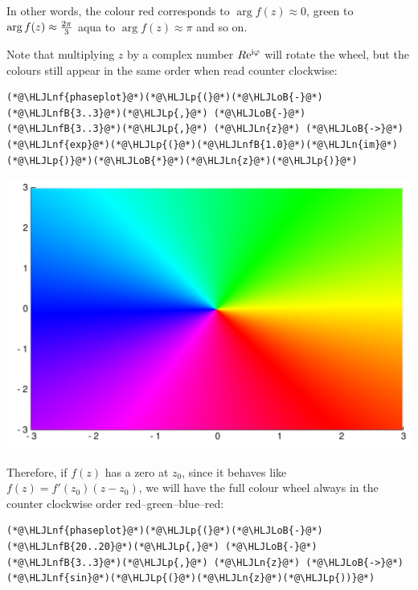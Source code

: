 \documentclass[12pt,a4paper]{article}
\newcommand{\HLJLn}[1]{#1}
\newcommand{\HLJLnf}[1]{\textcolor[RGB]{66,102,213}{#1}}
\newcommand{\HLJLnfB}[1]{\textcolor[RGB]{59,151,46}{#1}}
\newcommand{\HLJLoB}[1]{\textcolor[RGB]{102,102,102}{\textbf{#1}}}
\newcommand{\HLJLp}[1]{#1}
\def\I{ {\rm i} }
\def\E{ {\rm e} }
\def\endash{–}
\begin{document}
In other words, the colour red corresponds to $\arg f(z) \approx 0$, green to $\arg f(z) \approx {2 \pi \over 3}$ aqua to $\arg f(z) \approx \pi$ and so on. 

Note that multiplying $z$ by a complex number $R \E^{\I \varphi}$ will rotate the wheel, but the colours still appear in the same order when read counter clockwise:


\begin{lstlisting}
(*@\HLJLnf{phaseplot}@*)(*@\HLJLp{(}@*)(*@\HLJLoB{-}@*)(*@\HLJLnfB{3..3}@*)(*@\HLJLp{,}@*) (*@\HLJLoB{-}@*)(*@\HLJLnfB{3..3}@*)(*@\HLJLp{,}@*) (*@\HLJLn{z}@*) (*@\HLJLoB{->}@*) (*@\HLJLnf{exp}@*)(*@\HLJLp{(}@*)(*@\HLJLnfB{1.0}@*)(*@\HLJLn{im}@*)(*@\HLJLp{)}@*)(*@\HLJLoB{*}@*)(*@\HLJLn{z}@*)(*@\HLJLp{)}@*)
\end{lstlisting}

\includegraphics[width=\linewidth]{figures/Lecture1_6_1.pdf}

Therefore, if $f(z)$ has a zero at $z_0$, since it behaves like $f(z) = f'(z_0) (z - z_0)$, we will have the full colour wheel always in the counter clockwise order red\ensuremath{\endash}green\ensuremath{\endash}blue\ensuremath{\endash}red:


\begin{lstlisting}
(*@\HLJLnf{phaseplot}@*)(*@\HLJLp{(}@*)(*@\HLJLoB{-}@*)(*@\HLJLnfB{20..20}@*)(*@\HLJLp{,}@*) (*@\HLJLoB{-}@*)(*@\HLJLnfB{3..3}@*)(*@\HLJLp{,}@*) (*@\HLJLn{z}@*) (*@\HLJLoB{->}@*) (*@\HLJLnf{sin}@*)(*@\HLJLp{(}@*)(*@\HLJLn{z}@*)(*@\HLJLp{))}@*)
\end{lstlisting}
\end{document}
